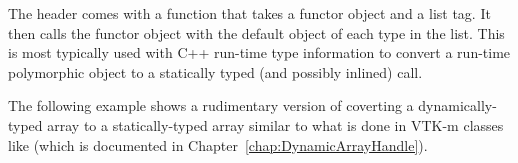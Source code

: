 The  header comes with a 
function that takes a functor object and a list tag. It then calls the
functor object with the default object of each type in the list. This is
most typically used with C++ run-time type information to convert a
run-time polymorphic object to a statically typed (and possibly inlined)
call.

The following example shows a rudimentary version of coverting a
dynamically-typed array to a statically-typed array similar to what is done
in VTK-m classes like  (which is documented in
Chapter~\ref{chap:DynamicArrayHandle}).



